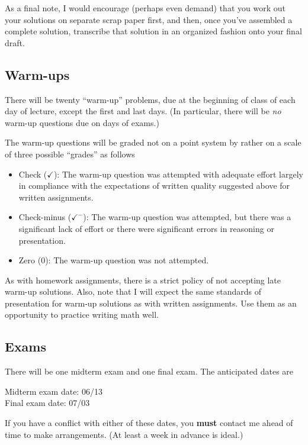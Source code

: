 \documentclass[12pt]{article}
\begin{document}
As a final note, I would encourage (perhaps even demand) that you work out your solutions on separate scrap paper first, and then, once you've assembled a complete solution, transcribe that solution in an organized fashion onto your final draft. 

\subsection*{Warm-ups}

There will be twenty ``warm-up'' problems, due at the beginning of class of each day of lecture, except the first and last days. (In particular, there will be \emph{no} warm-up questions due on days of exams.) 

The warm-up questions will be graded not on a point system by rather on a scale of three possible ``grades'' as follows
\begin{itemize}
\item Check ($\checkmark$): The warm-up question was attempted with adequate effort largely in compliance with the expectations of written quality suggested above for written assignments. 
\item Check-minus ($\checkmark^-$): The warm-up question was attempted, but there was a significant lack of effort or there were significant errors in reasoning or presentation. 
\item Zero ($0$): The warm-up question was not attempted. 
\end{itemize} 
As with homework assignments, there is a strict policy of not accepting late warm-up solutions.  Also, note that I will expect the same standards of presentation for warm-up solutions as with written assignments. Use them as an opportunity to practice writing math well. 


\subsection*{Exams}

There will be one midterm exam and one final exam. The anticipated dates are 

\vspace{3mm}

\noindent Midterm exam date: 06/13 \\
Final exam date: 07/03

\vspace{3mm}

\noindent If you have a conflict with either of these dates, you \textbf{must} contact me ahead of time to make arrangements. (At least a week in advance is ideal.) 
\end{document}
